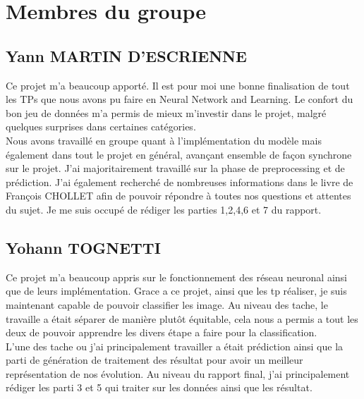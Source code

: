 \documentclass[12pt ,a4paper ]{article}
\begin{document}
\section{Membres du groupe}
\subsection{Yann MARTIN D'ESCRIENNE}
Ce projet m'a beaucoup apporté. Il est pour moi une bonne finalisation de tout les TPs que nous avons pu faire en Neural Network and Learning. Le confort du bon jeu de données m'a permis de mieux m'investir dans le projet, malgré quelques surprises dans certaines catégories.\\

Nous avons travaillé en groupe quant à l'implémentation du modèle mais également dans tout le projet en général, avançant ensemble de façon synchrone sur le projet. J'ai majoritairement travaillé sur la phase de preprocessing et de prédiction. J'ai également recherché de nombreuses informations dans le livre de François CHOLLET afin de pouvoir répondre à toutes nos questions et attentes du sujet. 
Je me suis occupé de rédiger les parties 1,2,4,6 et 7 du rapport. 

\subsection{Yohann TOGNETTI}
Ce projet m'a beaucoup appris sur le fonctionnement des réseau neuronal ainsi que de leurs implémentation. Grace a ce projet, ainsi que les tp réaliser, je suis maintenant capable de pouvoir classifier les image. Au niveau des tache, le travaille a était séparer de manière plutôt équitable, cela nous a permis a tout les deux de pouvoir apprendre les divers étape a faire pour la classification.\\
L'une des tache ou j'ai principalement travailler a était prédiction ainsi que la parti de génération de traitement des résultat pour avoir un meilleur représentation de nos évolution. 
Au niveau du rapport final, j'ai principalement rédiger les parti 3 et 5 qui traiter sur les données ainsi que les résultat.
\newpage
\end{document}
